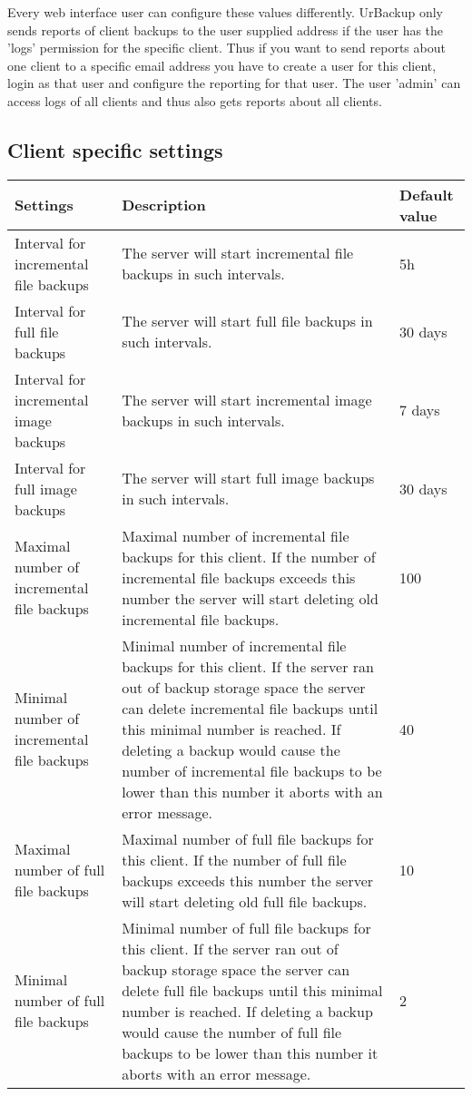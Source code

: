 \documentclass[a4paper,10pt]{article} \usepackage[breaklinks=true]{hyperref}
\begin{document}
Every web interface user can configure these values differently. UrBackup only sends reports of client backups to the user supplied address if the user has the 'logs' permission for the specific client. Thus if you want to send reports about one client to a specific email address you have to create a user for this client, login as that user and configure the reporting for that user. The user 'admin' can access logs of all clients and thus also gets reports about all clients.

\subsection{Client specific settings}

\begin{longtable}{|p{}|p{}|p{}|}
\hline
Settings  & Description & Default value\\
\hline\hline
Interval for incremental file backups & The server will start incremental file backups in such intervals. & 5h\\
\hline
Interval for full file backups & The server will start full file backups in such intervals. & 30 days\\
\hline
Interval for incremental image backups & The server will start incremental image backups in such intervals. & 7 days\\
\hline
Interval for full image backups & The server will start full image backups in such intervals. & 30 days\\
\hline
Maximal number of incremental file backups & Maximal number of incremental file backups for this client. If the number of
 incremental file backups exceeds this number the server will start deleting old incremental file backups. & 100\\
\hline 
Minimal number of incremental file backups & Minimal number of incremental file backups for this client. If the server ran out of backup storage space the server can delete incremental file backups until this minimal number is reached. If deleting a backup would cause the number of incremental file backups to be lower than this number it aborts with an error message. & 40\\
\hline
Maximal number of full file backups & Maximal number of full file backups for this client. If the number of
 full file backups exceeds this number the server will start deleting old full file backups. & 10\\
\hline
Minimal number of full file backups & Minimal number of full file backups for this client. If the server ran out of backup storage space the server can delete full file backups until this minimal number is reached. If deleting a backup would cause the number of full file backups to be lower than this number it aborts with an error message. & 2\\

\end{longtable}
\end{document}
